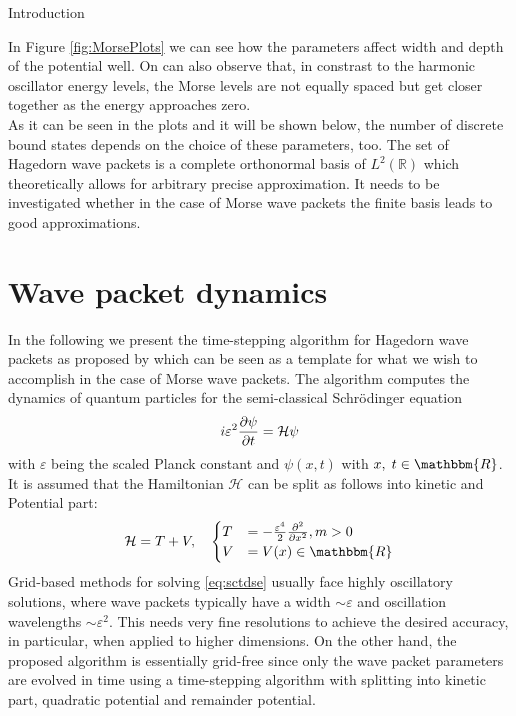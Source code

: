 \begin{chapter}{Introduction}
\begin{figure}[h!]
\end{figure}

In Figure \ref{fig:MorsePlots} we can see how the parameters affect width and depth of the potential well. On can also observe
that, in constrast to the harmonic oscillator energy levels, the Morse levels are not equally spaced but get closer together as the energy
approaches zero.\\

As it can be seen in the plots and it will be shown below, the number of discrete bound states
depends on the choice of these parameters, too.
The set of Hagedorn wave packets is a complete orthonormal basis of $L^2(\mathbb{R})$ which theoretically allows for
arbitrary precise approximation. It needs to be investigated whether in the case of Morse wave packets the finite basis leads to good approximations.\\



\section{Wave packet dynamics} %
\label{sec:Wave packet dynamics}
In the following we present the time-stepping algorithm for Hagedorn wave packets as proposed by \cite{FGL_semiclassical_dynamics} which can be seen as a template for what we
wish to accomplish in the case of Morse wave packets. The algorithm computes the dynamics of quantum particles for the semi-classical Schrödinger
equation
\begin{equation}
    \label{eq:sctdse}
    i\varepsilon^2\frac{\partial \psi}{\partial t}=\mathcal{H}\psi
\end{equation}
with $\varepsilon$ being the scaled Planck constant and  $\psi(x,t)$ with $x,\;t\in\mathbbm{R}$.\\
It is assumed that the Hamiltonian $\mathcal{H}$ can be split as follows into kinetic and Potential part:
\begin{equation}
	\mathcal{H}=T+V,\quad\begin{cases}
	    T&=-\frac{\varepsilon^4}{2}\pdiff{^2}{x^2}, m>0\\
	    V&=V(x)\in\mathbbm{R}
	\end{cases}
\end{equation}
Grid-based methods for solving \eqref{eq:sctdse} usually face highly oscillatory solutions, where wave packets typically have a width
$\sim\varepsilon$ and oscillation wavelengths $\sim \varepsilon^2$. This needs very fine resolutions to achieve the desired accuracy, in particular,
when applied to higher dimensions. On the other hand, the proposed algorithm is essentially grid-free since only the wave packet parameters are evolved
in time using a time-stepping algorithm with splitting into kinetic part, quadratic potential and remainder potential.


\end{chapter}
